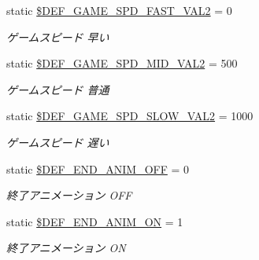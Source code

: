 \begin{DoxyCompactItemize}
static \hyperlink{class_reversi_const_a6fa812c8bbe57a64fd92223fd3b71086}{\$\+D\+E\+F\+\_\+\+G\+A\+M\+E\+\_\+\+S\+P\+D\+\_\+\+F\+A\+S\+T\+\_\+\+V\+A\+L2} = 0
\begin{DoxyCompactList}\small\item\em ゲームスピード 早い \end{DoxyCompactList}\item 
\mbox{\label{class_reversi_const_a016bb70e8fca576083b82f70c5abf022}} 
static \hyperlink{class_reversi_const_a016bb70e8fca576083b82f70c5abf022}{\$\+D\+E\+F\+\_\+\+G\+A\+M\+E\+\_\+\+S\+P\+D\+\_\+\+M\+I\+D\+\_\+\+V\+A\+L2} = 500
\begin{DoxyCompactList}\small\item\em ゲームスピード 普通 \end{DoxyCompactList}\item 
\mbox{\label{class_reversi_const_a6742adf1a0780356fd92b8a18c1710c8}} 
static \hyperlink{class_reversi_const_a6742adf1a0780356fd92b8a18c1710c8}{\$\+D\+E\+F\+\_\+\+G\+A\+M\+E\+\_\+\+S\+P\+D\+\_\+\+S\+L\+O\+W\+\_\+\+V\+A\+L2} = 1000
\begin{DoxyCompactList}\small\item\em ゲームスピード 遅い \end{DoxyCompactList}\item 
\mbox{\label{class_reversi_const_a61944ae88b15f2b7a1e0fafa6427b1d9}} 
static \hyperlink{class_reversi_const_a61944ae88b15f2b7a1e0fafa6427b1d9}{\$\+D\+E\+F\+\_\+\+E\+N\+D\+\_\+\+A\+N\+I\+M\+\_\+\+O\+FF} = 0
\begin{DoxyCompactList}\small\item\em 終了アニメーション O\+FF \end{DoxyCompactList}\item 
\mbox{\label{class_reversi_const_ad0da61a2d5650bdefb8db60d69d686ed}} 
static \hyperlink{class_reversi_const_ad0da61a2d5650bdefb8db60d69d686ed}{\$\+D\+E\+F\+\_\+\+E\+N\+D\+\_\+\+A\+N\+I\+M\+\_\+\+ON} = 1
\begin{DoxyCompactList}\small\item\em 終了アニメーション ON \end{DoxyCompactList}\item 
\mbox{\label{class_reversi_const_a2dd1b7bb9f8733961e1b526d977bf64e}} 

\end{DoxyCompactItemize}
